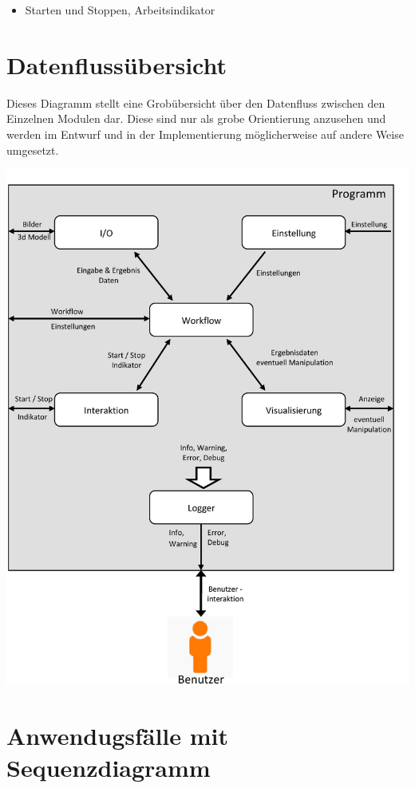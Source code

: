 \begin{itemize}
\item Starten und Stoppen, Arbeitsindikator 
\end{itemize}

\newpage 
\section{Datenflussübersicht}

Dieses Diagramm stellt eine Grobübersicht über den Datenfluss zwischen den Einzelnen Modulen dar.
Diese sind nur als grobe Orientierung anzusehen und werden im Entwurf und in der Implementierung möglicherweise auf andere Weise umgesetzt.
\begin{normalsize}

\end{normalsize}
\includegraphics[scale=0.28]{img/Datenflussuebersicht.jpg} 
\newpage 
\section{Anwendugsfälle mit Sequenzdiagramm}
